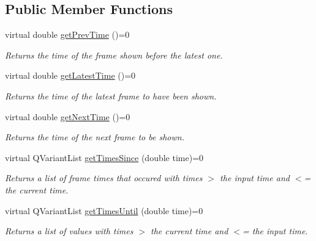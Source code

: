 \subsection*{Public Member Functions}
\begin{DoxyCompactItemize}
\item 
\hypertarget{class_picto_1_1_frame_reader_a266475bf248fc8d37302f1e366d014ef}{virtual double \hyperlink{class_picto_1_1_frame_reader_a266475bf248fc8d37302f1e366d014ef}{get\-Prev\-Time} ()=0}\label{class_picto_1_1_frame_reader_a266475bf248fc8d37302f1e366d014ef}

\begin{DoxyCompactList}\small\item\em Returns the time of the frame shown before the latest one. \end{DoxyCompactList}\item 
\hypertarget{class_picto_1_1_frame_reader_afd59891270131ac7c5167d83a2a58909}{virtual double \hyperlink{class_picto_1_1_frame_reader_afd59891270131ac7c5167d83a2a58909}{get\-Latest\-Time} ()=0}\label{class_picto_1_1_frame_reader_afd59891270131ac7c5167d83a2a58909}

\begin{DoxyCompactList}\small\item\em Returns the time of the latest frame to have been shown. \end{DoxyCompactList}\item 
\hypertarget{class_picto_1_1_frame_reader_a2bab74f48f5ad35eecc0d8946cec328b}{virtual double \hyperlink{class_picto_1_1_frame_reader_a2bab74f48f5ad35eecc0d8946cec328b}{get\-Next\-Time} ()=0}\label{class_picto_1_1_frame_reader_a2bab74f48f5ad35eecc0d8946cec328b}

\begin{DoxyCompactList}\small\item\em Returns the time of the next frame to be shown. \end{DoxyCompactList}\item 
\hypertarget{class_picto_1_1_frame_reader_a2309aed7290f38527e2fe93280e06141}{virtual Q\-Variant\-List \hyperlink{class_picto_1_1_frame_reader_a2309aed7290f38527e2fe93280e06141}{get\-Times\-Since} (double time)=0}\label{class_picto_1_1_frame_reader_a2309aed7290f38527e2fe93280e06141}

\begin{DoxyCompactList}\small\item\em Returns a list of frame times that occured with times $>$ the input time and $<$= the current time. \end{DoxyCompactList}\item 
\hypertarget{class_picto_1_1_frame_reader_a73677f4f5bca3ee04eb4593417e69146}{virtual Q\-Variant\-List \hyperlink{class_picto_1_1_frame_reader_a73677f4f5bca3ee04eb4593417e69146}{get\-Times\-Until} (double time)=0}\label{class_picto_1_1_frame_reader_a73677f4f5bca3ee04eb4593417e69146}

\begin{DoxyCompactList}\small\item\em Returns a list of values with times $>$ the current time and $<$= the input time. \end{DoxyCompactList}\end{DoxyCompactItemize}
